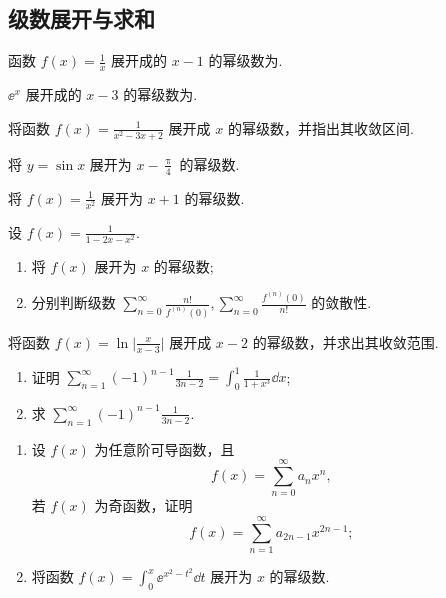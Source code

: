 \subsection{级数展开与求和}

	\begin{ti}
		函数 $f(x) = \frac{1}{x}$ 展开成的 $x - 1$ 的幂级数为\htwo.
	\end{ti}

	\begin{ti}
		$\ee^{x}$ 展开成的 $x - 3$ 的幂级数为\htwo.
	\end{ti}

	\begin{ti}
		将函数 $f(x) = \frac{1}{x^{2} - 3x + 2}$ 展开成 $x$ 的幂级数，并指出其收敛区间.
	\end{ti}

	\begin{ti}
		将 $y = \sin x$ 展开为 $x - \frac{\uppi}{4}$ 的幂级数.
	\end{ti}

	\begin{ti}
		将 $f(x) = \frac{1}{x^{2}}$ 展开为 $x + 1$ 的幂级数.
	\end{ti}

	\begin{ti}
		设 $f(x) = \frac{1}{1 - 2x - x^{2}}$.
		\begin{enumerate}
			\item 将 $f(x)$ 展开为 $x$ 的幂级数;
			\item 分别判断级数 $\sum_{n=0}^{\infty} \frac{n!}{f^{(n)}(0)}, \sum_{n=0}^{\infty} \frac{f^{(n)}(0)}{n!}$ 的敛散性.
		\end{enumerate}
	\end{ti}

	\begin{ti}
		将函数 $f(x) = \ln \bigl| \frac{x}{x - 3} \bigr|$ 展开成 $x - 2$ 的幂级数，并求出其收敛范围.
	\end{ti}

	\begin{ti}
		\begin{enumerate}
			\item 证明 $\sum_{n=1}^{\infty} (-1)^{n-1} \frac{1}{3n - 2} = \int_{0}^{1} \frac{1}{1 + x^{3}} \dd{x}$;
			\item 求 $\sum_{n=1}^{\infty} (-1)^{n-1} \frac{1}{3n - 2}$.
		\end{enumerate}
	\end{ti}

	\begin{ti}
		\begin{enumerate}
			\item 设 $f(x)$ 为任意阶可导函数，且
			\[
				f(x) = \sum_{n=0}^{\infty} a_{n} x^{n},
			\]
			若 $f(x)$ 为奇函数，证明
			\[
				f(x) = \sum_{n=1}^{\infty} a_{2n-1} x^{2n-1};
			\]
			\item 将函数 $f(x) = \int_{0}^{x} \ee^{x^{2} - t^{2}} \dd{t}$ 展开为 $x$ 的幂级数.
		\end{enumerate}
	\end{ti}

